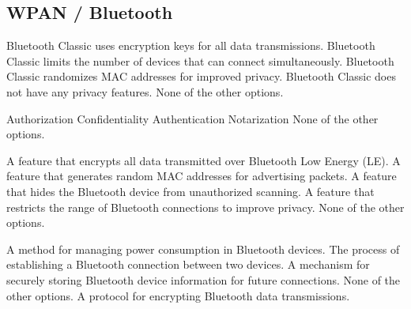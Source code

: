\begin{questions}
    \section{WPAN / Bluetooth}

    \begin{checkboxes}
        \choice Bluetooth Classic uses encryption keys for all data transmissions.
        \choice Bluetooth Classic limits the number of devices that can connect simultaneously.
        \choice Bluetooth Classic randomizes MAC addresses for improved privacy.
        \choice Bluetooth Classic does not have any privacy features.
        \choice None of the other options.
    \end{checkboxes}


    \begin{checkboxes}
        \CorrectChoice Authorization
        \CorrectChoice Confidentiality
        \CorrectChoice Authentication
        \choice Notarization
        \choice None of the other options.
    \end{checkboxes}




    \begin{checkboxes}
        \choice A feature that encrypts all data transmitted over Bluetooth Low Energy (LE).
        \CorrectChoice A feature that generates random MAC addresses for advertising packets.
        \choice A feature that hides the Bluetooth device from unauthorized scanning.
        \choice A feature that restricts the range of Bluetooth connections to improve privacy.
        \choice None of the other options.
    \end{checkboxes}


    \begin{checkboxes}
        \choice A method for managing power consumption in Bluetooth devices.
        \CorrectChoice The process of establishing a Bluetooth connection between two devices.
        \choice A mechanism for securely storing Bluetooth device information for future connections.
        \choice None of the other options.
        \choice A protocol for encrypting Bluetooth data transmissions.
    \end{checkboxes}


\end{questions}
